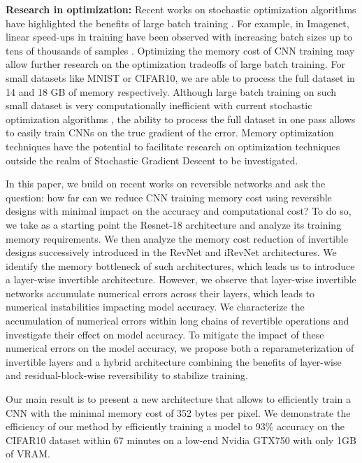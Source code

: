 \documentclass[twocolumn]{bmcart}
\begin{document}
\textbf{Research in optimization:}
Recent works on stochastic optimization algorithms have highlighted the benefits of large batch training \cite{shallue2018measuring,largebatch}.
For example, in Imagenet, linear speed-ups in training have been observed with increasing batch sizes up to tens of thousands of samples \cite{largebatch}.
Optimizing the memory cost of CNN training may allow further research on the optimization tradeoffs of large batch training.
For small datasets like MNIST or CIFAR10, we are able to process the full dataset in 14 and 18 GB of memory respectively.
Although large batch training on such small dataset is very computationally inefficient with current stochastic optimization algorithms \cite{largebatch},
the ability to process the full dataset in one pass allows to easily train CNNs on the true gradient of the error.
Memory optimization techniques have the potential to facilitate research on optimization techniques outside the realm of Stochastic Gradient Descent to be investigated.

In this paper, we build on recent works on reversible networks \cite{gomez2017reversible,jacobsen2018revnet} and ask the question: 
how far can we reduce CNN training memory cost using reversible designs with minimal impact on the accuracy and computational cost?
To do so, we take as a starting point the Resnet-18 architecture and analyze its training memory requirements.
We then analyze the memory cost reduction of invertible designs successively introduced in the RevNet and iRevNet architectures.
We identify the memory bottleneck of such architectures, which leads us to introduce a layer-wise invertible architecture.
However, we observe that layer-wise invertible networks accumulate numerical errors across their layers, which leads to numerical instabilities impacting model accuracy.
We characterize the accumulation of numerical errors within long chains of revertible operations and investigate their effect on model accuracy.
To mitigate the impact of these numerical errors on the model accuracy, we propose both a reparameterization of invertible layers and a hybrid architecture combining the benefits of layer-wise and residual-block-wise reversibility to stabilize training.

Our main result is to present a new architecture that allows to efficiently train a CNN with the minimal memory cost of 352 bytes per pixel.
We demonstrate the efficiency of our method by efficiently training a model to 93\% accuracy on the CIFAR10 dataset within 67 minutes on a low-end Nvidia GTX750 with only 1GB of VRAM.
\end{document}
